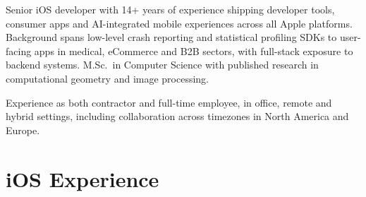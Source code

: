 \documentclass[11pt,a4paper,roman]{moderncv} %
\begin{document}




\makecvtitle 

\hspace{1em} Senior iOS developer with 14+ years of experience shipping developer tools, consumer apps and AI-integrated mobile experiences across all Apple platforms. Background spans low-level crash reporting and statistical profiling SDKs to user-facing apps in medical, eCommerce and B2B sectors, with full-stack exposure to backend systems. M.Sc.\ in Computer Science with published research in computational geometry and image processing.

\hspace{1em} Experience as both contractor and full-time employee, in office, remote and hybrid settings, including collaboration across timezones in North America and Europe.

\vspace{1em}

\section{iOS Experience}
\end{document}
